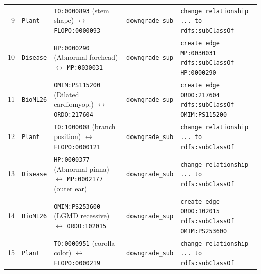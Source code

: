 \documentclass[10pt]{article}
\theoremstyle{accentthm}
\begin{document}
\begin{table}[htbp]
\begin{tabularx}{\textwidth}{@{}rllp{1.9cm}>{\raggedright\arraybackslash}X@{}}
9 & \texttt{Plant} & \texttt{TO:0000893} (stem shape) $\leftrightarrow$ \texttt{FLOPO:0000093} & \texttt{downgrade\_sub} & \texttt{change relationship ... to rdfs:subClassOf} \\
10 & \texttt{Disease} & \texttt{HP:0000290} (Abnormal forehead) $\leftrightarrow$ \texttt{MP:0030031} & \texttt{downgrade\_sup} & \texttt{create edge MP:0030031 rdfs:subClassOf HP:0000290} \\
11 & \texttt{BioML26} & \texttt{OMIM:PS115200} (Dilated cardiomyop.) $\leftrightarrow$ \texttt{ORDO:217604} & \texttt{downgrade\_sup} & \texttt{create edge ORDO:217604 rdfs:subClassOf OMIM:PS115200} \\
12 & \texttt{Plant} & \texttt{TO:1000008} (branch position) $\leftrightarrow$ \texttt{FLOPO:0000121} & \texttt{downgrade\_sub} & \texttt{change relationship ... to rdfs:subClassOf} \\
13 & \texttt{Disease} & \texttt{HP:0000377} (Abnormal pinna) $\leftrightarrow$ \texttt{MP:0002177} (outer ear) & \texttt{downgrade\_sub} & \texttt{change relationship ... to rdfs:subClassOf} \\
14 & \texttt{BioML26} & \texttt{OMIM:PS253600} (LGMD recessive) $\leftrightarrow$ \texttt{ORDO:102015} & \texttt{downgrade\_sup} & \texttt{create edge ORDO:102015 rdfs:subClassOf OMIM:PS253600} \\
15 & \texttt{Plant} & \texttt{TO:0000951} (corolla color) $\leftrightarrow$ \texttt{FLOPO:0000219} & \texttt{downgrade\_sub} & \texttt{change relationship ... to rdfs:subClassOf} \\
\bottomrule
\end{tabularx}
\end{table}

\clearpage


\end{document}
